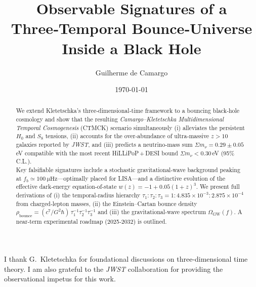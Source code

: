 \documentclass[reprint,amsmath,amssymb,aps,prd,nofootinbib,longbibliography]{revtex4-2}
\begin{document}
\title{Observable Signatures of a Three‑Temporal Bounce‑Universe Inside a Black Hole}

\author{Guilherme de Camargo}
\date{\today}


\begin{abstract}
We extend Kletetschka's three‑dimensional‑time framework to a bouncing black‑hole cosmology and show that the resulting \textit{Camargo–Kletetschka Multidimensional Temporal Cosmogenesis} (CTMCK) scenario simultaneously (i) alleviates the persistent $H_0$ and $S_8$ tensions, (ii) accounts for the over‑abundance of ultra‑massive $z>10$ galaxies reported by \textit{JWST}, and (iii) predicts a neutrino‑mass sum $\Sigma m_\nu = 0.29\pm0.05\,$eV compatible with the most recent HiLLiPoP\,+\,DESI bound $\Sigma m_\nu<0.30\,$eV (95\% C.L.). \\[2pt]
Key falsifiable signatures include a stochastic gravitational‑wave background peaking at $f_b\simeq\SI{100}{\micro\hertz}$—optimally placed for \textsc{LISA}—and a distinctive evolution of the effective dark‑energy equation‑of‑state $w(z)=-1+0.05(1+z)^3$. We present full derivations of (i) the temporal‑radius hierarchy $\tau_1\!:\!\tau_2\!:\!\tau_3 = 1\!:\!4.835\times10^{-3}\!:\!2.875\times10^{-4}$ from charged‑lepton masses, (ii) the Einstein–Cartan bounce density $\rho_{\text{bounce}}=(c^7/G^2\hbar)\,\tau_1^{-1}\tau_2^{-1}\tau_3^{-1}$ and (iii) the gravitational‑wave spectrum $\Omega_{\mathrm{GW}}(f)$. A near‑term experimental roadmap (2025‑2032) is outlined.
\end{abstract}

\maketitle











\begin{acknowledgments}
I thank G.~Kletetschka for foundational discussions on three‑dimensional time theory. I am also grateful to the \textit{JWST} collaboration for providing the observational impetus for this work.
\end{acknowledgments}



\end{document}
